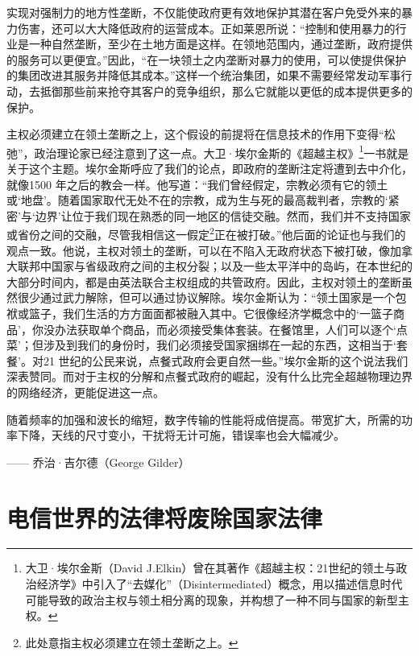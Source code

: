 实现对强制力的地方性垄断，不仅能使政府更有效地保护其潜在客户免受外来的暴力伤害，还可以大大降低政府的运营成本。正如莱恩所说：“控制和使用暴力的行业是一种自然垄断，至少在土地方面是这样。在领地范围内，通过垄断，政府提供的服务可以更便宜。”因此，“在一块领土之内垄断对暴力的使用，可以使提供保护的集团改进其服务并降低其成本。”这样一个统治集团，如果不需要经常发动军事行动，去抵御那些前来抢夺其客户的竞争组织，那么它就能以更低的成本提供更多的保护。

主权必须建立在领土垄断之上，这个假设的前提将在信息技术的作用下变得“松弛”，政治理论家已经注意到了这一点。大卫·埃尔金斯的《超越主权》\footnote{大卫·埃尔金斯（David J.Elkin）曾在其著作《超越主权：21世纪的领土与政治经济学》中引入了“去媒化”（Disintermediated）概念，用以描述信息时代可能导致的政治主权与领土相分离的现象，并构想了一种不同与国家的新型主权。}一书就是关于这个主题。埃尔金斯呼应了我们的论点，即政府的垄断注定将遭到去中介化，就像1500 年之后的教会一样。他写道：“我们曾经假定，宗教必须有它的领土或‘地盘’。随着国家取代无处不在的宗教，成为生与死的最高裁判者，宗教的‘紧密’与‘边界’让位于我们现在熟悉的同一地区的信徒交融。然而，我们并不支持国家或省份之间的交融，尽管我相信这一假定\footnote{此处意指主权必须建立在领土垄断之上。}正在被打破。”他后面的论证也与我们的观点一致。他说，主权对领土的垄断，可以在不陷入无政府状态下被打破，像加拿大联邦中国家与省级政府之间的主权分裂；以及一些太平洋中的岛屿，在本世纪的大部分时间内，都是由英法联合主权组成的共管政府。因此，主权对领土的垄断虽然很少通过武力解除，但可以通过协议解除。埃尔金斯认为：“领土国家是一个包袱或篮子，我们生活的方方面面都被融入其中。它很像经济学概念中的‘一篮子商品’，你没办法获取单个商品，而必须接受集体套装。在餐馆里，人们可以逐个‘点菜’；但涉及到我们的身份时，我们必须接受国家捆绑在一起的东西，这相当于‘套餐’。对21 世纪的公民来说，点餐式政府会更自然一些。”埃尔金斯的这个说法我们深表赞同。而对于主权的分解和点餐式政府的崛起，没有什么比完全超越物理边界的网络经济，更能促进这一点。


\begin{tcolorbox}
\kaishu 随着频率的加强和波长的缩短，数字传输的性能将成倍提高。带宽扩大，所需的功率下降，天线的尺寸变小，干扰将无计可施，错误率也会大幅减少。
\begin{flushright}
—— 乔治·吉尔德（George Gilder）    
\end{flushright}
\end{tcolorbox}


\section{电信世界的法律将废除国家法律}


